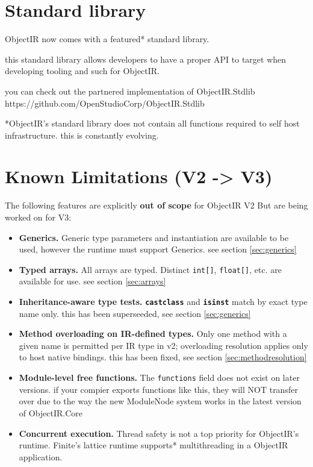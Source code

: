 \documentclass[11pt,a4paper]{article}
\newcommand{\opcode}[1]{\textbf{\texttt{#1}}}
\begin{document}
\section{Standard library}
\label{sec:stdlib}
ObjectIR now comes with a featured* standard library.

this standard library allows developers to have a proper API to target when developing tooling and such for ObjectIR.

you can check out the partnered implementation of ObjectIR.Stdlib
https://github.com/OpenStudioCorp/ObjectIR.Stdlib

*ObjectIR's standard library does not contain all functions required to 
self host infrastructure. this is constantly evolving.

\section{Known Limitations (V2 -> V3)}
\label{sec:limits}

The following features are explicitly \textbf{out of scope} for ObjectIR V2
But are being worked on for V3:

\begin{itemize}[leftmargin=1.8em]
  \item \textbf{Generics.} Generic type parameters and instantiation are
  available to be used, however the runtime must support Generics. 
  see section \ref{sec:generics}
    
  \item \textbf{Typed arrays.} All arrays are typed. Distinct
    \texttt{int[]}, \texttt{float[]}, etc. are available for use. 
    see section \ref{sec:arrays}
  
  \item \textbf{Inheritance-aware type tests.} \opcode{castclass} and
    \opcode{isinst} match by exact type name only.
    this has been superseeded, see section \ref{sec:generics}
    
  \item \textbf{Method overloading on IR-defined types.} Only one method
    with a given name is permitted per IR type in v2; overloading resolution
    applies only to host native bindings.
    this has been fixed, see section \ref{sec:methodresolution}

  \item \textbf{Module-level free functions.} The \texttt{functions} field does not exist on later versions.
  if your compier exports functions like this, they will NOT transfer over due to 
  the way the new ModuleNode system works in the latest version of ObjectIR.Core
  
  \item \textbf{Concurrent execution.} Thread safety is not a top priority for ObjectIR's runtime.
  Finite's lattice runtime supports* multithreading in a ObjectIR application.
\end{itemize}
\end{document}
